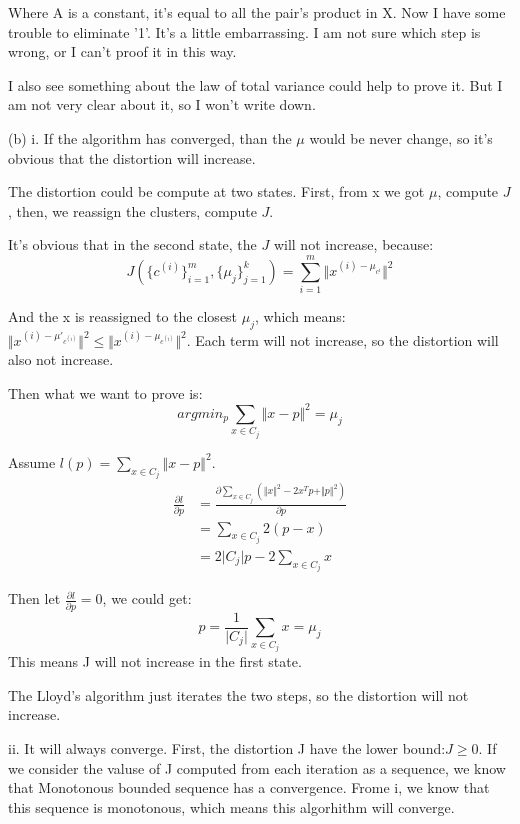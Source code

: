 \documentclass[a4paper]{article}
\begin{document}
Where A is a constant, it's equal to 	all the pair's product in X. 
Now I have some trouble to eliminate '1'. It's a little embarrassing. I am not sure which step is wrong, or I can't proof it in this way.

I also see something about the law of total variance could help to prove it. But I am not very clear about it, so I won't write down.

(b) i.
If the algorithm has converged, than the $\mu$ would be never change, so it's obvious that the distortion will increase.

The distortion could be compute at two states. First, from x we got $\mu$, compute $J$, then, we reassign the clusters, compute $J$.

It's obvious that in the second state, the $J$ will not increase, because:
$$
J(\{c^{(i)}\}_{i=1}^m,\{\mu_j\}_{j=1}^k) = \sum_{i=1}^m\Vert x^{(i) - \mu_{c^{i}}}\Vert^2
$$

And the x is reassigned to the closest $\mu_j$, which means:$\Vert x^{(i) - \mu'_{c^{(i)}}}\Vert ^2 \leq \Vert x^{(i) - \mu_{c^{(i)}}}\Vert ^2$. Each term will not increase, so the distortion will also not increase.

Then what we want to prove is:
$$
argmin_{p} \sum_{x\in C_j} \Vert x - p \Vert^2 = \mu_j
$$

Assume $l(p) =  \sum_{x\in C_j} \Vert x - p \Vert^2$.
$$
\begin{aligned}
\frac{\partial l}{\partial p} &=\frac{\partial\sum_{x \in C_j} \left(\Vert x \Vert^2 - 2x^Tp + \Vert p\Vert^2\right)}{\partial p}\\
&=\sum_{x \in C_j}2(p -  x)\\
&= 2 \vert C_j\vert p - 2 \sum_{x \in C_j} x
\end{aligned}
$$

Then let $\frac{\partial l}{\partial p} = 0$, we could get:
$$
p = \frac{1}{\vert C_j\vert} \sum_{x \in C_j} x = \mu_j
$$
This means J will not increase in the first state.

The Lloyd's algorithm just iterates the two steps, so the distortion will not increase. 

ii. It will always converge. First, the distortion J have the lower bound:$J \ge 0$. If we consider the valuse of J computed from each iteration as a sequence, we know that Monotonous bounded sequence has a convergence. Frome i, we know that this sequence is monotonous, which means this algorhithm will converge.
\end{document}
